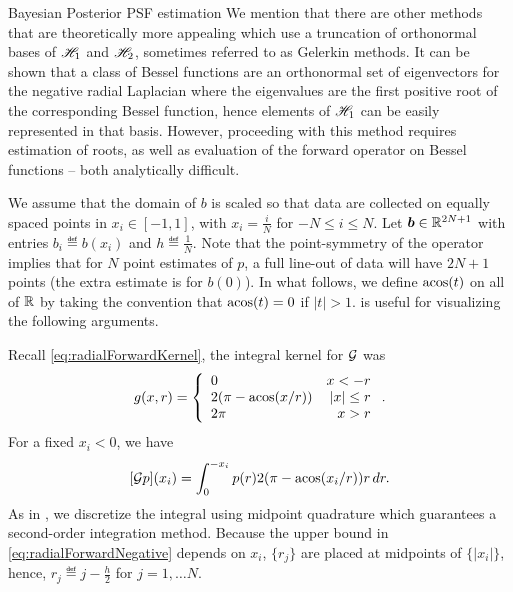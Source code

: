 \begin{chapter}{Bayesian Posterior PSF estimation}
We mention that there are other methods that are theoretically more appealing which use a truncation of orthonormal bases of $\mathscr H _1$ and $\mathscr H_2$, sometimes referred to as Gelerkin methods.
It can be shown that a class of Bessel functions are an orthonormal set of eigenvectors for the negative radial Laplacian where the eigenvalues are the first positive root of the corresponding Bessel function, hence elements of $\mathscr H_1$ can be easily represented in that basis.
However, proceeding with this method requires estimation of roots, as well as evaluation of the forward operator on Bessel functions -- both analytically difficult.


We assume that the domain of $b$ is scaled so that data are collected on equally spaced points in $x_i \in [-1,1]$, with $x_i = \frac iN$ for $-N\le i\le N$.
Let $\mbox{\boldmath$b$} \in \mathbb R^{2N + 1}$ with entries $b_i \eqdef b(x_i)$ and $h\eqdef \frac 1N$. 
Note that the point-symmetry of the operator implies that for $N$ point estimates of $p$, a full line-out of data will have $2N + 1$ points (the extra estimate is for $b(0)$).
In what follows, we define $\operatorname*{acos}(t)$ on all of $\mathbb R$ by taking the convention that $\operatorname*{acos}(t) = 0$ if $|t| > 1$.
 is useful for visualizing the following arguments.

Recall \eqref{eq:radialForwardKernel}, the integral kernel for $\mathcal G$ was
\begin{equation} 
  g(x,r) = \left\{\begin{array}{lr}
    0 & x < - r\\
    2(\pi - \operatorname*{acos}(x/r)) & |x| \le r\\
    2\pi &  x> r
  \end{array}\right..  
\end{equation}
For a fixed  $x_i<0$, we have
\begin{equation} \label{eq:radialForwardNegative}
  [\mathcal G p](x_i) = \int_0^{-x_i} p(r)2(\pi - \operatorname*{acos}(x_i/r))r\,dr.
\end{equation}
As in \citep{bardsley2012mcmc}, we discretize the integral using midpoint quadrature which guarantees a second-order integration method.
Because the upper bound in \eqref{eq:radialForwardNegative} depends on $x_i$, $\{r_j\}$ are placed at midpoints of $\{|x_i|\}$, hence, $r_j \eqdef j-\frac h2$ for $j=1,\dots N$. 


\end{chapter}
